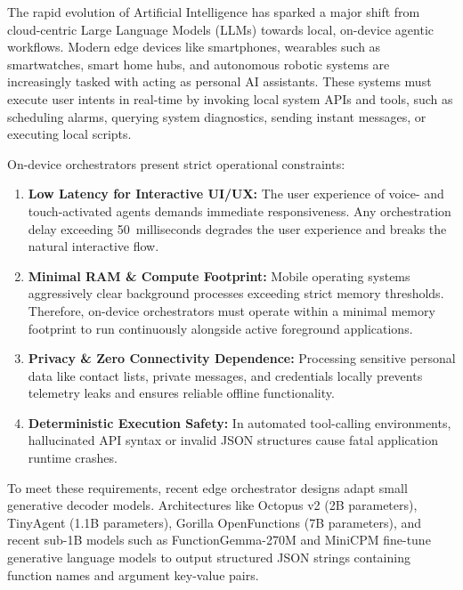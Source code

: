 \documentclass[letterpaper]{article} %
\begin{document}
The rapid evolution of Artificial Intelligence has sparked a major shift from cloud-centric Large Language Models (LLMs) towards local, on-device agentic workflows. Modern edge devices like smartphones, wearables such as smartwatches, smart home hubs, and autonomous robotic systems are increasingly tasked with acting as personal AI assistants. These systems must execute user intents in real-time by invoking local system APIs and tools, such as scheduling alarms, querying system diagnostics, sending instant messages, or executing local scripts.

On-device orchestrators present strict operational constraints:
\begin{enumerate}
    \item \textbf{Low Latency for Interactive UI/UX:} The user experience of voice- and touch-activated agents demands immediate responsiveness. Any orchestration delay exceeding 50~milliseconds degrades the user experience and breaks the natural interactive flow.
    \item \textbf{Minimal RAM \& Compute Footprint:} Mobile operating systems aggressively clear background processes exceeding strict memory thresholds. Therefore, on-device orchestrators must operate within a minimal memory footprint to run continuously alongside active foreground applications.
    \item \textbf{Privacy \& Zero Connectivity Dependence:} Processing sensitive personal data like contact lists, private messages, and credentials locally prevents telemetry leaks and ensures reliable offline functionality.
    \item \textbf{Deterministic Execution Safety:} In automated tool-calling environments, hallucinated API syntax or invalid JSON structures cause fatal application runtime crashes.
\end{enumerate}

To meet these requirements, recent edge orchestrator designs adapt small generative decoder models. Architectures like Octopus v2 \citep{chen2024octopus} (2B parameters), TinyAgent \citep{erdogan2024tinyagent} (1.1B parameters), Gorilla OpenFunctions \citep{patil2023gorilla} (7B parameters), and recent sub-1B models such as FunctionGemma-270M \citep{google2025functiongemma} and MiniCPM \citep{openbmb2024minicpm} fine-tune generative language models to output structured JSON strings containing function names and argument key-value pairs.
\end{document}
